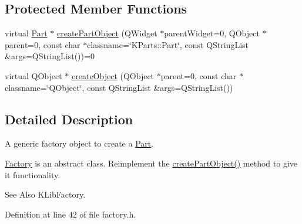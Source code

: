 \subsection*{Protected Member Functions}
\begin{DoxyCompactItemize}
\item 
virtual \hyperlink{classKParts_1_1Part}{Part} $\ast$ \hyperlink{classKParts_1_1Factory_a05e336b747b65776e31db466736570f2}{create\+Part\+Object} (Q\+Widget $\ast$parent\+Widget=0, Q\+Object $\ast$parent=0, const char $\ast$classname=\char`\"{}K\+Parts\+::\+Part\char`\"{}, const Q\+String\+List \&args=Q\+String\+List())=0
\item 
virtual Q\+Object $\ast$ \hyperlink{classKParts_1_1Factory_accec62e4a6f005b82cfad965cbeb1d7b}{create\+Object} (Q\+Object $\ast$parent=0, const char $\ast$classname=\char`\"{}Q\+Object\char`\"{}, const Q\+String\+List \&args=Q\+String\+List())
\end{DoxyCompactItemize}


\subsection{Detailed Description}
A generic factory object to create a \hyperlink{classKParts_1_1Part}{Part}.

\hyperlink{classKParts_1_1Factory}{Factory} is an abstract class. Reimplement the \hyperlink{classKParts_1_1Factory_a05e336b747b65776e31db466736570f2}{create\+Part\+Object()} method to give it functionality.

\begin{DoxySeeAlso}{See Also}
K\+Lib\+Factory. 
\end{DoxySeeAlso}


Definition at line 42 of file factory.\+h.



